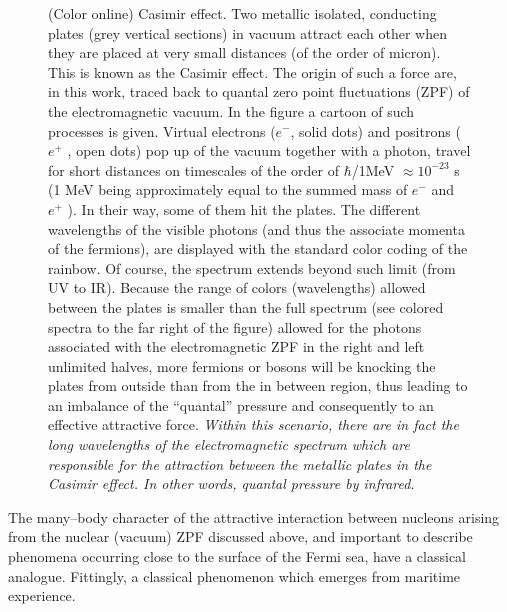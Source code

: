 \begin{subappendices}
\begin{figure}
\caption{(Color online) Casimir effect. Two metallic isolated, conducting plates (grey vertical sections) in vacuum attract
each other when they are placed at very small distances (of the order of micron). This is known as the
Casimir effect. The origin of such a force
are, in this work, traced back to quantal zero point fluctuations (ZPF) of the electromagnetic vacuum. In
the figure a cartoon of such processes is given. Virtual electrons ($e^-$, solid dots) and positrons ($e^+$ , open
dots) pop up of the vacuum together with a photon, travel for short distances on timescales of the order
of $\hbar$/1MeV $\approx10^{-23}$  s (1 MeV being approximately equal to the summed mass of $e^-$ and $e^+$ ). In their
way, some of them hit the plates. The different wavelengths of the visible photons (and thus the associate
momenta of the fermions), are displayed with the standard color coding of the rainbow. Of course, the
spectrum extends beyond such limit (from UV to IR). Because the range of colors (wavelengths) allowed between
the plates is smaller than the full spectrum (see colored spectra to the far right of the figure) allowed for
the photons associated with the electromagnetic ZPF in the right and left unlimited halves, more fermions
or bosons will be knocking the plates from outside than from the in between region, thus leading to an imbalance of
the ``quantal'' pressure and consequently to an effective attractive force. \emph{Within this scenario, there are in fact the long wavelengths of the electromagnetic spectrum which are responsible for the attraction between the metallic plates in the Casimir effect. In other words, quantal pressure by infrared}.}\label{fig6G3}
\end{figure}
The many--body character of the attractive interaction between nucleons arising from the nuclear (vacuum) ZPF discussed above, and important to describe phenomena occurring close to the surface of the Fermi sea, have a classical analogue. Fittingly, a classical phenomenon which emerges from maritime experience. 



\end{subappendices}
